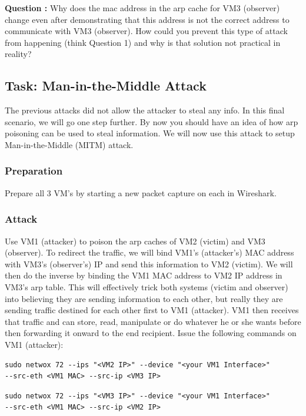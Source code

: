 \documentclass{article}
\begin{document}
\textbf{Question :} Why does the mac address in the arp cache for VM3 (observer) change even after demonstrating that this address is not the correct address to communicate with VM3 (observer). How could you prevent this type of attack from happening (think Question 1) and why is that solution not practical in reality?
\addtocounter{Question}{1}

\subsection{Task: Man-in-the-Middle Attack}
The previous attacks did not allow the attacker to steal any info. In this final scenario, we will go one step further. By now you should have an idea of how arp poisoning can be used to steal information. We will now use this attack to setup Man-in-the-Middle (MITM) attack.
\subsubsection{Preparation}
Prepare all 3 VM's by starting a new packet capture on each in Wireshark. 

\subsubsection{Attack}
Use VM1 (attacker) to poison the arp caches of VM2 (victim) and VM3 (observer). To redirect the traffic, we will bind VM1's (attacker's) MAC address with VM3's (observer's) IP and send this information to VM2 (victim). We will then do the inverse by binding the VM1 MAC address to VM2 IP address in VM3's arp table. This will effectively trick both systems (victim and observer) into believing they are sending information to each other, but really they are sending traffic destined for each other first to VM1 (attacker). VM1 then receives that traffic and can store, read, manipulate or do whatever he or she wants before then forwarding it onward to the end recipient. Issue the following commands on VM1 (attacker):

\begin{verbatim}sudo netwox 72 --ips "<VM2 IP>" --device "<your VM1 Interface>" 
--src-eth <VM1 MAC> --src-ip <VM3 IP>
\end{verbatim}
\begin{verbatim}sudo netwox 72 --ips "<VM3 IP>" --device "<your VM1 Interface>" 
--src-eth <VM1 MAC> --src-ip <VM2 IP>
\end{verbatim}
\end{document}
